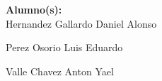{\begin{center}
\begin{center}
			 \LARGE	{ \textbf{Alumno(s):}}\\%
	 
			 \normalsize	 {Hernandez Gallardo Daniel Alonso}
			 
			 \vspace{-0.5cm}
			 
			 \normalsize		{Perez Osorio Luis Eduardo}
			 
			 \vspace{-0.5cm}
			 
			 \normalsize		{Valle Chavez Anton Yael}
			 
			 
					 \vspace{1.25cm}
					 \vspace{0.9cm}
					 
				 \end{center}
		 
			 \end{center} 
}
